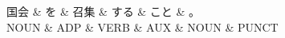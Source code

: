 \documentclass[tikz,border=5pt]{standalone}
\begin{document}
\normalsize
\begin{dependency}[edge unit distance=12.0pt]
    \begin{deptext}[column sep=1em]
        国会 \& を \& 召集 \& する \& こと \& 。\\
        NOUN \& ADP \& VERB \& AUX \& NOUN \& PUNCT\\
    \end{deptext}
\end{dependency}
\end{document}
